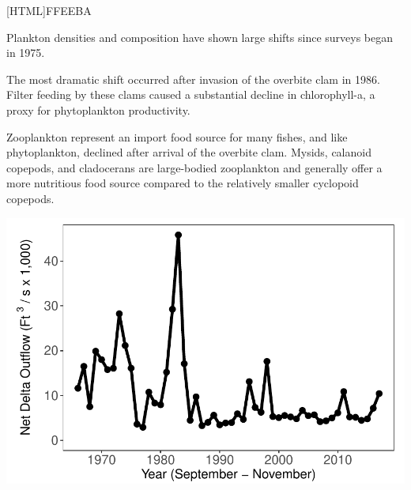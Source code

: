 \documentclass[]{article}\usepackage[]{graphicx}\usepackage[]{color}
\makeatletter
\def\maxwidth{ %
  \ifdim\Gin@nat@width>\linewidth
    \linewidth
  \else
    \Gin@nat@width
  \fi
}
\makeatother
\begin{document}
\begin{Row}
  \begin{Cell}{2}
    \setlength{\fboxrule}{1.7pt}
    [HTML]{FFEEBA}{\parbox{\textwidth}{
			\begin{itemize}[leftmargin=*]
				{\large 
					\item Plankton densities and composition have shown large shifts since 
					surveys began in 1975.
					\item The most dramatic shift occurred after invasion of the overbite clam 
					in 1986. Filter feeding by these clams caused a substantial decline in 
					chlorophyll-a, a proxy for phytoplankton productivity.
					\item Zooplankton represent an import food source for many fishes, and like 
					phytoplankton, declined after arrival of the overbite clam. Mysids, calanoid 
					copepods, and cladocerans are large-bodied zooplankton and generally offer a 
					more nutritious food source compared to the relatively smaller cyclopoid 
					copepods.
				}
			\end{itemize}
    }}
  \end{Cell}
  \begin{Cell}{1}
    \vspace{-3.5cm}


{\centering \includegraphics[width=\maxwidth]{figures/flow_fig_2-1} 

}



  \end{Cell}
\end{Row}

\vspace{-0cm}
\end{document}
